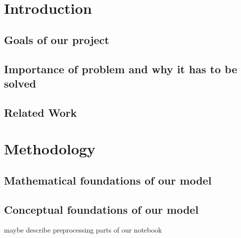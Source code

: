 \section{Introduction}

\subsection{Goals of our project}

\subsection{Importance of problem and why it has to be solved}

\subsection{Related Work}


\section{Methodology}

\subsection{Mathematical foundations of our model}

\subsection{Conceptual foundations of our model}

maybe describe preprocessing parts of our notebook
